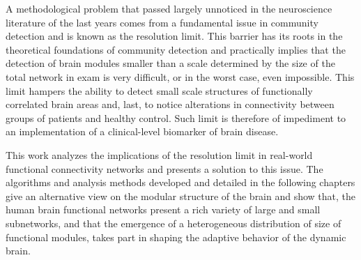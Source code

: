 A methodological problem that passed largely unnoticed in the neuroscience literature of the last years comes from a fundamental issue in community detection and is known as the resolution limit. This barrier has its roots in the theoretical foundations of community detection and practically implies that the detection of brain modules smaller than a scale determined by the size of the total network in exam is very difficult, or in the worst case, even impossible. This limit hampers the ability to detect small scale structures of functionally correlated brain areas and, last, to notice alterations in connectivity between groups of patients and healthy control. Such limit is therefore of impediment to an implementation of a clinical-level biomarker of brain disease.

This work analyzes the implications of the resolution limit in real-world functional connectivity networks and presents a solution to this issue.
The algorithms and analysis methods developed and detailed in the following chapters give an alternative view on the modular structure of the brain and show that, the human brain functional networks present a rich variety of large and small subnetworks, and that the emergence of a heterogeneous distribution of size of functional modules, takes part in shaping the adaptive behavior of the dynamic brain.


